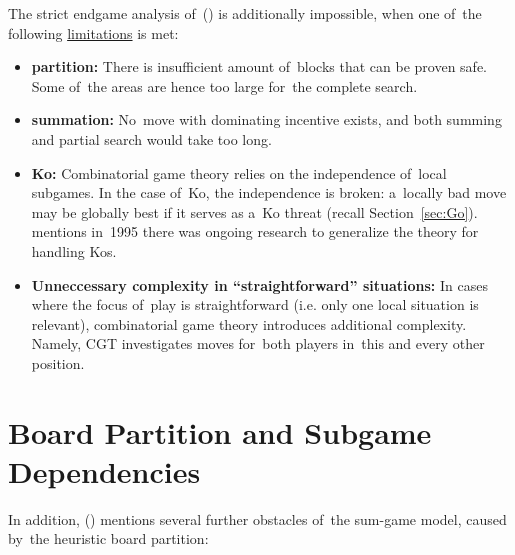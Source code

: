 The strict endgame analysis of~(\cite{Muller1995computer}) is additionally impossible, when one of~the following \underline{limitations} is met:
\begin{itemize}[-]
  \item \textbf{partition:}
    There is insufficient amount of~blocks that can be proven safe.
    Some of~the areas are hence too large for~the complete search.
  \item \textbf{summation:}
    No~move with dominating incentive exists, and both summing and partial search would take too long.
  \item \textbf{Ko:}
    Combinatorial game theory relies on the independence of~local subgames.
    In the case of~Ko, the independence is broken:
    a~locally bad move may be globally best if it serves as a~Ko threat (recall Section~\ref{sec:Go}).
    \Mueller{} mentions in~1995 there was ongoing research to generalize the theory for handling Kos.
  \item \textbf{Unneccessary complexity in ``straightforward'' situations:}
    In cases where the focus of~play is straightforward (i.e. only one local situation is relevant), combinatorial game theory introduces additional complexity.
    Namely, CGT investigates moves for~both players in~this and every other position.
\end{itemize}

\section{Board Partition and Subgame Dependencies}
In addition, (\cite{Muller1995computer}) mentions several further obstacles of~the sum-game model, caused by~the heuristic board partition:

